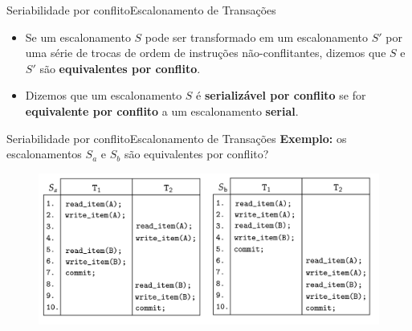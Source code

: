 \documentclass[t]{beamer}
\begin{document}

\begin{ftst}{Seriabilidade por conflito}{Escalonamento de Transações}

\begin{itemize}
    \item Se um escalonamento $S$ pode ser transformado em um escalonamento $S'$ por uma série de trocas de ordem de instruções não-conflitantes, dizemos que $S$ e $S'$ são \textbf{equivalentes por conflito}.
    \item Dizemos que um escalonamento $S$ é \textbf{serializável por conflito} se for \textbf{equivalente por conflito} a um escalonamento \textbf{serial}.

\end{itemize}

\end{ftst}


\begin{ftst}{Seriabilidade por conflito}{Escalonamento de Transações}
\textbf{Exemplo:} os escalonamentos $S_a$ e $S_b$ são equivalentes por conflito?

\begin{figure}
    \centering
    \includegraphics[scale=0.13]{Figuras_transacoes/15.png}
\end{figure}

\end{ftst}
\end{document}
